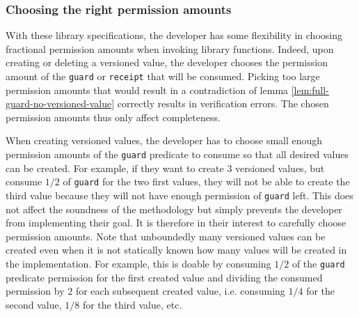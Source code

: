 


\subsubsection{Choosing the right permission amounts}
\label{sec:choosing-the-right-permission-amounts}

With these library specifications, the developer has some flexibility in choosing fractional permission amounts when invoking library functions.
Indeed, upon creating or deleting a versioned value, the developer chooses the permission amount of the \texttt{guard} or \texttt{receipt} that will be consumed.
Picking too large permission amounts that would result in a contradiction of lemma \ref{lem:full-guard-no-versioned-value} correctly results in verification errors.
The chosen permission amounts thus only affect completeness.

When creating versioned values, the developer has to choose small enough permission amounts of the \texttt{guard} predicate to consume so that all desired values can be created.
For example, if they want to create $3$ versioned values, but consume $1/2$ of \texttt{guard} for the two first values, they will not be able to create the third value because they will not have enough permission of \texttt{guard} left.
This does not affect the soundness of the methodology but simply prevents the developer from implementing their goal.
It is therefore in their interest to carefully choose permission amounts.
Note that unboundedly many versioned values can be created even when it is not statically known how many values will be created in the implementation.
For example, this is doable by consuming $1/2$ of the \texttt{guard} predicate permission for the first created value and dividing the consumed permission by $2$ for each subsequent created value, i.e. consuming $1/4$ for the second value, $1/8$ for the third value, etc.

